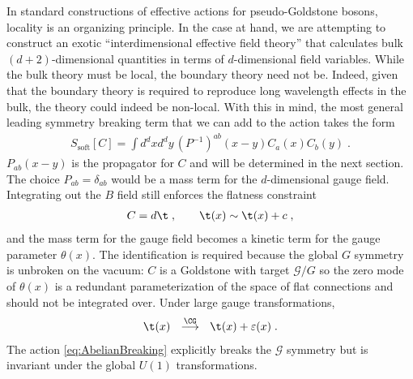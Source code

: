 \documentclass[11pt]{article}
\def\ve{{\varepsilon}}
\begin{document}
In standard constructions of effective actions for pseudo-Goldstone bosons, locality is an organizing principle. In the case at hand, we are attempting to construct an exotic ``interdimensional effective field theory'' that calculates bulk  $(d+2)$-dimensional quantities in terms of $d$-dimensional field variables. While the bulk theory must be local, the boundary theory need not be. Indeed, given that the boundary theory is required to reproduce long wavelength effects in the bulk, the theory could indeed be non-local. With this in mind, the most general leading symmetry breaking term that we can add to the action takes the form
\begin{equation}
\begin{split}\label{eq:AbelianBreaking}
S_{\text{soft}}[C] = \int d^d x d^d y \, (P^{-1})^{ab}(x-y) C_a(x) C_b(y) \; .
\end{split}
\end{equation}
$P_{ab}(x-y)$ is the propagator for $C$ and will be determined in the next section. The choice $P_{ab}=\delta_{ab}$ would be a mass term for the $d$-dimensional gauge field.  Integrating out the $B$ field still enforces the flatness constraint
\begin{equation}
\begin{split}\label{C-flat-theta}
C = d \t \; , \qquad \t(x) \sim \t(x) + c \; , 
\end{split}
\end{equation}
and the mass term for the gauge field becomes a kinetic term for the gauge parameter $\theta(x)$. The identification is required because the global $G$ symmetry is unbroken on the vacuum: $C$ is a Goldstone with target $\mathcal{G}/G$ so the zero mode of $\theta(x)$ is a redundant parameterization of the space of flat connections and should not be integrated over. Under large gauge transformations,
\begin{equation}
\begin{split}\label{theta-LGT}
\t(x) ~~ \stackrel{\CG}{\longrightarrow} ~~  \t(x) + \ve(x) \;.
\end{split}
\end{equation}
The action \eqref{eq:AbelianBreaking} explicitly breaks the $\mathcal{G}$ symmetry but is invariant under the global $U(1)$ transformations.
\end{document}
